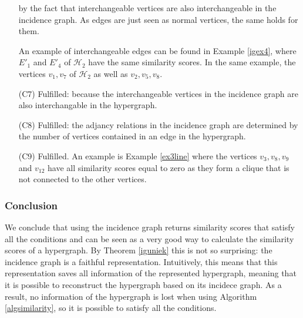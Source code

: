 \documentclass[a4paper,11pt]{report}
\newcommand{\hgrafeen}{\mathcal{H}}
\begin{document}
\begin{itemize}
\begin{center}
\end{center}
 by the fact that interchangeable vertices are also 
  interchangeable in the incidence graph. As edges are just seen as normal 
  vertices, the same holds for them. 
  
  An example of interchangeable edges can be found in Example \ref{igex4}, where 
  $E'_1$ and $E'_4$ of $\hgrafeen_2$ have the same similarity scores. In the same 
  example, the vertices $v_1, v_7$ of $\hgrafeen_2$ as well as $v_2, v_5, v_8$.
  \item[(C7)] Fulfilled: because the interchangeable vertices in the incidence graph are also interchangable in the hypergraph.
  \item[(C8)] Fulfilled: the adjancy relations in the incidence graph are determined by the number of vertices
  contained in an edge in the hypergraph.
    \item[(C9)] Fulfilled. An example is Example \ref{ex3line} where the 
    vertices $v_3, v_8, v_9$ and $v_12$ have all similarity scores equal to zero 
    as they form a clique that is not connected to the other vertices.
  \end{itemize}  
  \subsubsection{Conclusion}
  We conclude that using the incidence graph returns similarity scores that 
  satisfy all the conditions and can be seen as a very good way to calculate the 
  similarity scores of a hypergraph. By Theorem \ref{iguniek} this is not so 
  surprising: the incidence graph is a faithful representation. Intuitively, 
  this means that this representation saves all information of the represented 
  hypergraph, meaning that it is possible to reconstruct the hypergraph based on 
  its incidece graph. As a result, no information of the hypergraph is lost when using Algorithm \ref{algsimilarity},
  so it is possible to satisfy all the conditions. 
\end{document}
